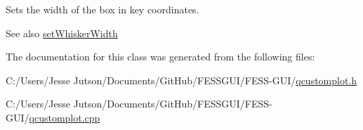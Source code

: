 Sets the width of the box in key coordinates.

\begin{DoxySeeAlso}{See also}
\hyperlink{class_q_c_p_statistical_box_adf378812446bd66f34d1f7f293d991cd}{set\+Whisker\+Width} 
\end{DoxySeeAlso}


The documentation for this class was generated from the following files\+:\begin{DoxyCompactItemize}
\item 
C\+:/\+Users/\+Jesse Jutson/\+Documents/\+Git\+Hub/\+F\+E\+S\+S\+G\+U\+I/\+F\+E\+S\+S-\/\+G\+U\+I/\hyperlink{qcustomplot_8h}{qcustomplot.\+h}\item 
C\+:/\+Users/\+Jesse Jutson/\+Documents/\+Git\+Hub/\+F\+E\+S\+S\+G\+U\+I/\+F\+E\+S\+S-\/\+G\+U\+I/\hyperlink{qcustomplot_8cpp}{qcustomplot.\+cpp}\end{DoxyCompactItemize}
